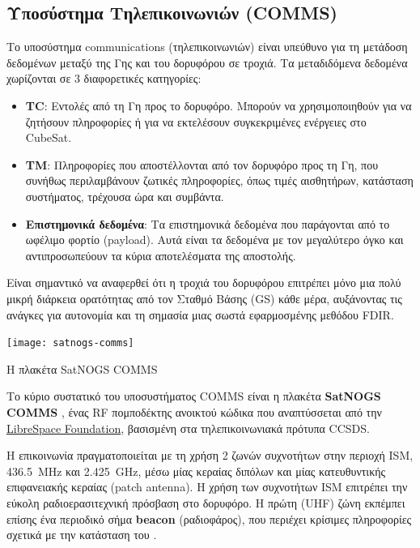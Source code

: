 \documentclass[a4paper,nobib]{tufte-book}
\begin{document}

\subsection{Υποσύστημα Τηλεπικοινωνιών (\acs{COMMS})}

Το υποσύστημα communications (τηλεπικοινωνιών) είναι υπεύθυνο για τη μετάδοση δεδομένων μεταξύ της Γης και του δορυφόρου σε τροχιά. Τα μεταδιδόμενα δεδομένα χωρίζονται σε 3 διαφορετικές κατηγορίες\autocite{DDJF_TTC}:
\begin{itemize}
	\item \textbf{\acf{TC}}: Εντολές από τη Γη προς το δορυφόρο. Μπορούν να χρησιμοποιηθούν για να ζητήσουν πληροφορίες ή για να εκτελέσουν συγκεκριμένες ενέργειες στο CubeSat.
	\item \textbf{\acf{TM}}: Πληροφορίες που αποστέλλονται από τον δορυφόρο προς τη Γη, που συνήθως περιλαμβάνουν ζωτικές πληροφορίες, όπως τιμές αισθητήρων, κατάσταση συστήματος, τρέχουσα ώρα και συμβάντα.
	\item \textbf{Επιστημονικά δεδομένα}: Τα επιστημονικά δεδομένα που παράγονται από το ωφέλιμο φορτίο (payload). Αυτά είναι τα δεδομένα με τον μεγαλύτερο όγκο και αντιπροσωπεύουν τα κύρια  αποτελέσματα της αποστολής.
\end{itemize}

Είναι σημαντικό να αναφερθεί ότι η τροχιά του δορυφόρου επιτρέπει μόνο μια πολύ μικρή διάρκεια ορατότητας από τον Σταθμό Βάσης (\acl{GS}) κάθε μέρα, αυξάνοντας τις ανάγκες για αυτονομία και τη σημασία μιας σωστά εφαρμοσμένης μεθόδου \acs{FDIR}.

\begin{marginfigure}
	\texttt{[image: satnogs-comms]}
	\caption{Η πλακέτα SatNOGS COMMS}
\end{marginfigure}

Το κύριο συστατικό του υποσυστήματος \acs{COMMS} είναι η πλακέτα \textbf{SatNOGS COMMS} \autocite{surligas_satnogscomms_2021}, ένας \acs{RF} πομποδέκτης ανοικτού κώδικα που αναπτύσσεται από την \href{https://libre.space/}{LibreSpace Foundation}, βασισμένη στα τηλεπικοινωνιακά πρότυπα \acs{CCSDS}.

Η επικοινωνία πραγματοποιείται με τη χρήση 2 ζωνών συχνοτήτων στην περιοχή \acs{ISM}, \SI{436.5}{\mega\hertz} και \SI{2.425}{\giga\hertz}, μέσω μίας κεραίας διπόλων και μίας κατευθυντικής επιφανειακής κεραίας (patch antenna). Η χρήση των συχνοτήτων \acs{ISM} επιτρέπει την εύκολη ραδιοερασιτεχνική πρόσβαση στο δορυφόρο. Η πρώτη (\acs{UHF}) ζώνη εκπέμπει επίσης ένα περιοδικό σήμα \textbf{beacon} (ραδιοφάρος), που περιέχει κρίσιμες πληροφορίες σχετικά με την κατάσταση του .
\end{document}
